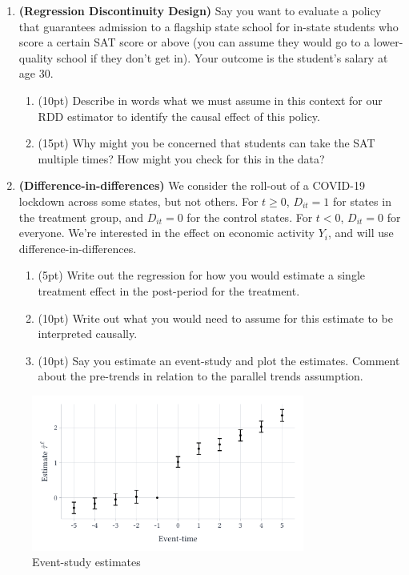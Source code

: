 \documentclass[12pt]{article}
\newcommand{\pts}[1]{{\color{zinc500}#1}}
\begin{document}
\begin{enumerate}
  \newpage
  \item \textbf{(Regression Discontinuity Design)}  Say you want to evaluate a policy that guarantees admission to a flagship state school for in-state students who score a certain SAT score or above (you can assume they would go to a lower-quality school if they don't get in). Your outcome is the student's salary at age 30.
  \begin{enumerate}[leftmargin = 2em]
    \item \pts{(10pt)} Describe in words what we must assume in this context for our RDD estimator to identify the causal effect of this policy. 
    
    \item \pts{(15pt)} Why might you be concerned that students can take the SAT multiple times? How might you check for this in the data?
  \end{enumerate}


  \item \textbf{(Difference-in-differences)}  We consider the roll-out of a COVID-19 lockdown across some states, but not others. For $t \geq 0$, $D_{it} = 1$ for states in the treatment group, and $D_{it} = 0$ for the control states. For $t < 0$, $D_{it} = 0$ for everyone. We're interested in the effect
  on economic activity $Y_{i}$, and will use difference-in-differences.
  \begin{enumerate}[leftmargin = 2em]
    \item \pts{(5pt)} Write out the regression for how you would estimate a single treatment effect in the post-period for the treatment. 
    
    \item \pts{(10pt)} Write out what you would need to assume for this estimate to be interpreted causally. 
    
    \item \pts{(10pt)} Say you estimate an event-study and plot the estimates. Comment about the pre-trends in relation to the parallel trends assumption.
  \end{enumerate}
\end{enumerate}

\begin{figure}[b!]
  \caption{Event-study estimates}
  \vspace*{-\medskipamount}
  \begin{center}
    \includegraphics[width=0.8\textwidth]{figures/did_bad_pretrends.pdf}
  \end{center}
\end{figure}
\end{document}
